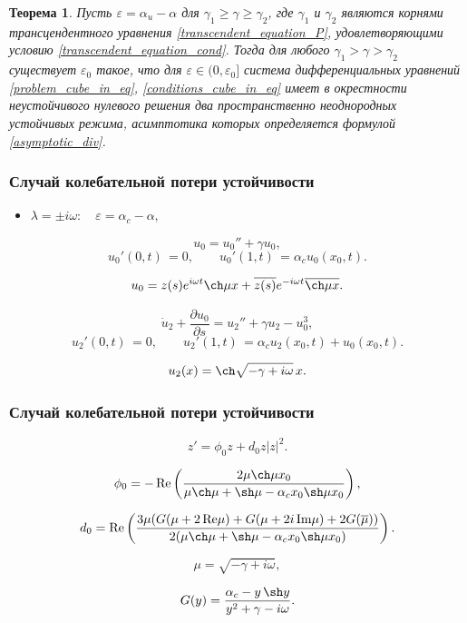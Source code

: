 \documentclass[fullscreen=true, unicode, bookmarks=false]{beamer}
\newtheorem{rustheorem}{Теорема }
\begin{document}
\begin{frame}

\begin{rustheorem}
Пусть $ \varepsilon = \alpha_u - \alpha $ для $\gamma_1 \geqslant \gamma \geqslant \gamma_2$, где $\gamma_1$ и $\gamma_2$ являются корнями трансцендентного уравнения \eqref{transcendent_equation_P}, удовлетворяющими условию \eqref{transcendent_equation_cond}. Тогда для любого $\gamma_1 > \gamma > \gamma_2$ существует $ \varepsilon_0 $ такое, что для $ \varepsilon \in (0, \varepsilon_0] $ система дифференциальных уравнений \eqref{problem_cube_in_eq}, \eqref{conditions_cube_in_eq} имеет в окрестности неустойчивого нулевого решения два пространственно неоднородных устойчивых режима, асимптотика которых определяется формулой \eqref{asymptotic_div}.
\end{rustheorem}

\end{frame}

\begin{frame}
\frametitle{ Случай колебательной потери устойчивости }

\begin{itemize}
\item { $ \lambda = \pm i \omega: \quad \varepsilon=\alpha_c-\alpha, $
}
\end{itemize}

\vfill

$$
u_0 = u_0'' + \gamma u_0,
$$
$$
u_0'(0, t) \, = 0, \qquad u_0'(1, t) \, = \alpha_c u_0(x_0, t).
$$

$$ u_0 = z(s) e^{i \omega t} \ch \mu x + \overline{z(s)} e^{-i \omega t} \overline{\ch \mu x}. $$

\vfill

$$
\dot u_2 + \frac{\partial u_0}{\partial s} = u_2'' + \gamma u_2 - u_0^3,
$$
$$
u_2'(0, t) \, = 0, \qquad u_2'(1, t) \, = \alpha_c u_2(x_0, t) + u_0(x_0, t).
$$

$$ u_2(x) = \ch \sqrt{-\gamma + i \omega} \, x. $$

\end{frame}


\begin{frame}
\frametitle{ Случай колебательной потери устойчивости }

$$
z' = \phi_0 z + d_0 z |z|^2.
$$

\bigskip

$$ \phi_0 = -\operatorname{Re} \left( \frac{ 2 \mu \ch \mu x_0 }{ \mu \ch \mu +\sh \mu - \alpha_c x_0 \sh \mu x_0 } \right), $$

$$ d_0 = \operatorname{Re} \left( \frac{ 3 \mu ( G(\mu + 2\,\mbox{Re}\mu) + G(\mu + 2i\,\mbox{Im}\mu) + 2G(\overline{\mu}) ) }{ 2 ( \mu \ch \mu +\sh \mu - \alpha_c x_0 \sh \mu x_0 ) } \right). $$

$$ \mu = \sqrt{-\gamma + i \omega}, $$

$$ G(y) = \frac{ \alpha_c - y\,\sh y }{ y^2 + \gamma - i\omega }. $$

\end{frame}
\end{document}

